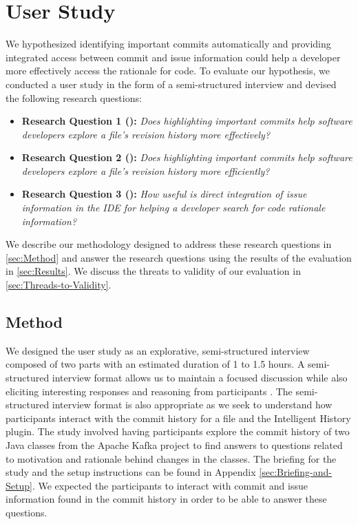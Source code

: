 \chapter{User Study}
\label{ch:Evaluation}

We hypothesized identifying important commits automatically and providing integrated access between commit and issue information could help a developer more effectively access the rationale for code.
To evaluate our hypothesis, we conducted a user study in the form of a semi-structured interview and devised the following research questions:

\begin{itemize}[leftmargin=*]
    \item[] \label{itm:RQ1} \textbf{Research Question 1 ():} \textit{Does highlighting important commits help software developers explore a file’s revision history more effectively?}
    \item[] \label{itm:RQ2} \textbf{Research Question 2 ():} \textit{Does highlighting important commits help software developers explore a file’s revision history more efficiently?}
    \item[] \label{itm:RQ3} \textbf{Research Question 3 ():} \textit{How useful is direct integration of issue information in the IDE for helping a developer search for code rationale information?}
  \end{itemize}

We describe our methodology designed to address these research questions in \autoref{sec:Method} and answer the research questions using the results of the evaluation in \autoref{sec:Results}.
We discuss the threats to validity of our evaluation in \autoref{sec:Threads-to-Validity}.

\section{Method}
\label{sec:Method}

We designed the user study as an explorative, semi-structured interview composed of two parts with an estimated duration of 1 to 1.5 hours.
A semi-structured interview format allows us to maintain a focused discussion while also eliciting interesting responses and reasoning from participants \cite{shull_guide_2007}.
The semi-structured interview format is also appropriate as we seek to understand how participants interact with the commit history for a file and the Intelligent History plugin.
The study involved having participants explore the commit history of two Java classes from the Apache Kafka project to find answers to questions related to motivation and rationale behind changes in the classes.
The briefing for the study and the setup instructions can be found in Appendix \ref{sec:Briefing-and-Setup}.
We expected the participants to interact with commit and issue information found in the commit history in order to be able to answer these questions.

